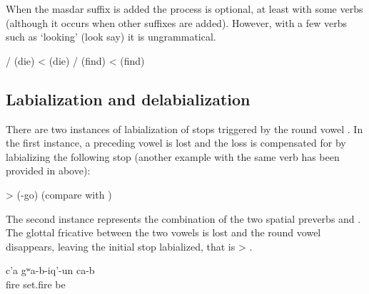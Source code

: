 When the masdar suffix is added the process is optional, at least with some verbs  (although it occurs when other suffixes are added). However, with a few verbs such as  `looking' (look say) it is ungrammatical.
%
\begin{exe}
	\ex	\label{ex:masdar palatalization phon}
	\begin{xlist}
		\ex	{}\slash{} (die) <  (die) 
		\ex	{}\slash{} (find) <  (find)
	\end{xlist}
\end{exe}



\subsection{Labialization and delabialization}
\label{ssec:Labialization and delabialization}

There are two instances of labialization of stops triggered by the round vowel . In the first instance, a preceding vowel is lost and the loss is compensated for by labializing the following stop (another example with the same verb has been provided in  above):
%
\begin{exe} \label{ex:insidephon2}
	\ex	{} >  \newline\hspace*{2em}(-go) (compare with )
\end{exe}

The second instance represents the combination of the two spatial preverbs   and  . The glottal fricative between the two vowels is lost and the round vowel disappears, leaving the initial stop labialized, that is  >  .
%
\begin{exe}
	\ex	\label{ex:She set up a phon}
	\gll	c'a	gʷa-b-iq'-un	ca-b\\
		fire	set.fire	be\\
	\glt	{}
\end{exe}

